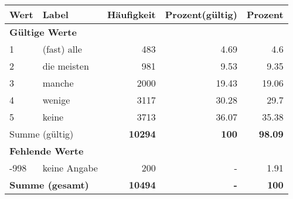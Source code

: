      \begin{longtable}{lXrrr}
     \toprule
     \textbf{Wert} & \textbf{Label} & \textbf{Häufigkeit} & \textbf{Prozent(gültig)} & \textbf{Prozent} \\
     \endhead
     \midrule
     \multicolumn{5}{l}{\textbf{Gültige Werte}}\\

     1 &
     \multicolumn{1}{X}{ (fast) alle   } &


       \num{483} &
       \num[round-mode=places,round-precision=2]{4.69} &
         \num[round-mode=places,round-precision=2]{4.6} \\

     2 &
     \multicolumn{1}{X}{ die meisten   } &


       \num{981} &
       \num[round-mode=places,round-precision=2]{9.53} &
         \num[round-mode=places,round-precision=2]{9.35} \\

     3 &
     \multicolumn{1}{X}{ manche   } &


       \num{2000} &
       \num[round-mode=places,round-precision=2]{19.43} &
         \num[round-mode=places,round-precision=2]{19.06} \\

     4 &
     \multicolumn{1}{X}{ wenige   } &


       \num{3117} &
       \num[round-mode=places,round-precision=2]{30.28} &
         \num[round-mode=places,round-precision=2]{29.7} \\

     5 &
     \multicolumn{1}{X}{ keine   } &


       \num{3713} &
       \num[round-mode=places,round-precision=2]{36.07} &
         \num[round-mode=places,round-precision=2]{35.38} \\
     \midrule
     \multicolumn{2}{l}{Summe (gültig)} &
       \textbf{\num{10294}} &
     \textbf{\num{100}} &
       \textbf{\num[round-mode=places,round-precision=2]{98.09}} \\
     \multicolumn{5}{l}{\textbf{Fehlende Werte}}\\
       -998 &
       keine Angabe &
         \num{200} &
        - &
         \num[round-mode=places,round-precision=2]{1.91} \\
     \midrule
     \multicolumn{2}{l}{\textbf{Summe (gesamt)}} &
          \textbf{\num{10494}} &
        \textbf{-} &
        \textbf{\num{100}} \\
     \bottomrule
     \end{longtable}
     

